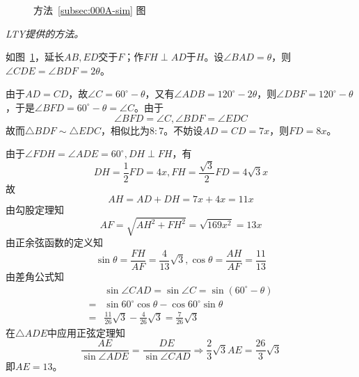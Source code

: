 \begin{figure}
  \centering {}
  \caption{方法~\ref{subsec:000A-sim} 图} \label{fig:000A-sim}
\end{figure}

\emph{LTY提供的方法。}

如图~\ref{fig:000A-sim}，延长$AB, ED$交于$F$；作$FH \perp AD$于$H$。设$\angle BAD = \theta$，则$\angle CDE = \angle BDF = 2\theta$。

由于$AD = CD$，故$\angle C = 60^\circ - \theta$，又有$\angle ADB = 120^\circ - 2\theta$，则$\angle DBF = 120^\circ - \theta$，于是$\angle BFD = 60^\circ - \theta = \angle C$。由于
\[ \angle BFD = \angle C, \angle BDF = \angle EDC \]
故而$\triangle BDF \sim \triangle EDC$，相似比为$8:7$。不妨设$AD = CD = 7x$，则$FD = 8x$。

由于$\angle FDH = \angle ADE = 60^\circ, DH \perp FH$，有
\[ DH = \frac12FD = 4x, FH = \frac{\sqrt3}2FD = 4\sqrt3x \]
故
\[ AH = AD + DH = 7x + 4x = 11x \]
由勾股定理知
\[ AF = \sqrt{AH^2 + FH^2} = \sqrt{169x^2} = 13x \]
由正余弦函数的定义知
\[ \sin\theta = \frac{FH}{AF} = \frac4{13}\sqrt3, \cos\theta = \frac{AH}{AF} = \frac{11}{13} \]
由差角公式知
\begin{align*}
  & \sin\angle CAD = \sin\angle C = \sin(60^\circ - \theta) \\
  ={}& \sin60^\circ\cos\theta - \cos60^\circ\sin\theta \\
  ={}& \frac{11}{26}\sqrt3 - \frac4{26}\sqrt3 = \frac7{26}\sqrt3
\end{align*}
在$\triangle ADE$中应用正弦定理知
\[ \frac{AE}{\sin\angle ADE} = \frac{DE}{\sin\angle CAD} \Rightarrow \frac23\sqrt3AE = \frac{26}3\sqrt3 \]
即$AE = 13$。
